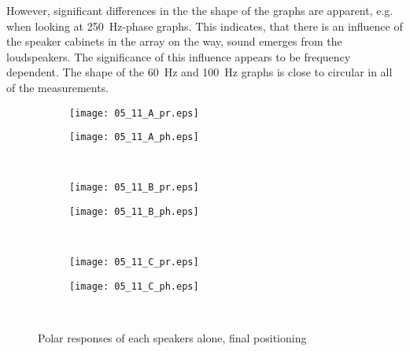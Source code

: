 However, significant differences in the the shape of the graphs are apparent, e.g. when looking at \SI{250}{\hertz}-phase graphs. This indicates, that there is an influence of the speaker cabinets in the array on the way, sound emerges from the loudspeakers. The significance of this influence appears to be frequency dependent. The shape of the \SI{60}{\hertz} and \SI{100}{\hertz} graphs is close to circular in all of the measurements.

\begin{figure}[h]
\begin{subfigure}[c]{0.5\textwidth}
\texttt{[image: 05\_11\_A\_pr.eps]}
\label{fig:05_11_A_pr}
\end{subfigure}
\begin{subfigure}[c]{0.5\textwidth}
\texttt{[image: 05\_11\_A\_ph.eps]}
\label{fig:05_11_A_ph}
\end{subfigure}\\
\hspace{0.1\textheight}
\begin{subfigure}[c]{0.5\textwidth}
\texttt{[image: 05\_11\_B\_pr.eps]}
\label{fig:05_11_A_pr}
\end{subfigure}
\begin{subfigure}[c]{0.5\textwidth}
\texttt{[image: 05\_11\_B\_ph.eps]}
\label{fig:05_11_A_ph}
\end{subfigure}\\
\hspace{0.1\textheight}
\begin{subfigure}[c]{0.5\textwidth}
\texttt{[image: 05\_11\_C\_pr.eps]}
\label{fig:05_11_A_pr}
\end{subfigure}
\begin{subfigure}[c]{0.5\textwidth}
\texttt{[image: 05\_11\_C\_ph.eps]}
\label{fig:05_11_A_ph}
\end{subfigure}\\
\caption{Polar responses of each speakers alone, final positioning}  
\label{fig:05_11_single}
\end{figure}

